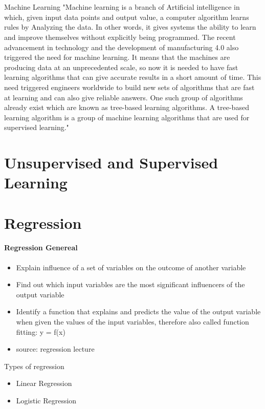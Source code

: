 \section{}{Machine Learning}
"Machine learning is a branch of Artificial intelligence in which, given input data points and output value, a computer algorithm learns rules by Analyzing the data. In other words, it gives systems the ability to learn and improve themselves without explicitly being programmed. The recent advancement in technology and the development of manufacturing 4.0 also triggered the need for machine learning. It means that the machines are producing data at an unprecedented scale, so now it is needed to have fast learning algorithms that can give accurate results in a short amount of time. This need triggered engineers worldwide to build new sets of algorithms that are fast at learning and can also give reliable answers. One such group of algorithms already exist which are known as tree-based learning algorithms. A tree-based learning algorithm is a group of machine learning algorithms that are used for supervised learning."
\cite{baig_machinelearningprediction_2021}


\section{Unsupervised and Supervised Learning}
\section{Regression}

\paragraph{Regression Genereal}

\begin{itemize}
    \item Explain influence of a set of variables on the outcome of another variable 
    \item Find out which input variables are the most significant influencers of the output variable 
    \item Identify a function that explains and predicts the value of the output variable when given the values of the input variables, therefore also called function fitting: y = f(x)
    \item source: regression lecture 
\end{itemize}

Types of regression
\begin{itemize}
    \item Linear Regression
    \item Logistic Regression
\end{itemize}

